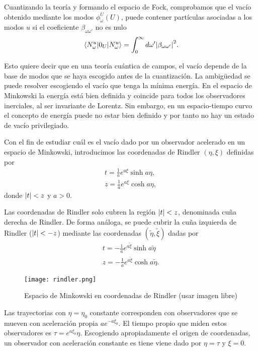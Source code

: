 Cuantizando la teoría y formando el espacio de Fock, comprobamos que el vacío obtenido mediante
los modos $\phi^U_\omega (U)$, puede contener partículas asociadas a los modos $u$
si el coeficiente $\beta_{\omega\omega'}$ no es nulo
\begin{equation}
  \ev{0_U}{N_\omega^u}=\int_0^\infty d\omega' \abs{\beta_{\omega\omega'}}^2.
\end{equation}

Esto quiere decir que en una teoría cuántica de campos, el vacío depende de la base de modos
que se haya escogido antes de la cuantización.
La ambigüedad se puede resolver escogiendo el vacío que tenga la mínima energía.
En el espacio de Minkowski la energía está bien definida y coincide para todos los observadores
inerciales, al ser invariante de Lorentz.
Sin embargo, en un espacio-tiempo curvo el concepto de energía puede no estar bien definido
y por tanto no hay un estado de vacío privilegiado.

Con el fin de estudiar cuál es el vacío dado por un observador acelerado en un espacio de 
Minkowski, introducimos las coordenadas de Rindler $(\eta,\xi)$ definidas por
\begin{gather}
  t=\frac{1}{a} e^{a\xi} \sinh a\eta ,\\
  z=\frac{1}{a}e^{a\xi} \cosh a\eta,
\end{gather}
donde $\abs{t}<z$ y $a>0$.

Las coordenadas de Rindler solo cubren la región $\abs{t}<z$, denominada cuña derecha de Rindler.
De forma análoga, se puede cubrir la cuña izquierda de Rindler ($\abs{t}<-z$) mediante
las coordenadas $(\tilde \eta, \tilde \xi)$ dadas por
\begin{gather}
  t=-\frac{1}{a} e^{a\tilde \xi} \sinh a\tilde \eta \\
  z=-\frac{1}{a} e^{a\tilde \xi} \cosh a\tilde \eta.
\end{gather}

\begin{figure}[htb]
\texttt{[image: rindler.png]}\hfill
 \caption{Espacio de Minkowski en coordenadas de Rindler (usar imagen libre)
}                   
  \label{fig:rindler}
\end{figure}

Las trayectorias con $\eta=\eta_0$ constante corresponden con observadores que se mueven con
aceleración propia $ae^{-a\xi_0}$.
El tiempo propio que miden estos observadores es $\tau = e^{a\xi_0}\eta$.
Escogiendo apropiadamente el origen de coordenadas, un observador con aceleración constante
es tiene viene dado por $\eta=\tau$ y $\xi=0$.

